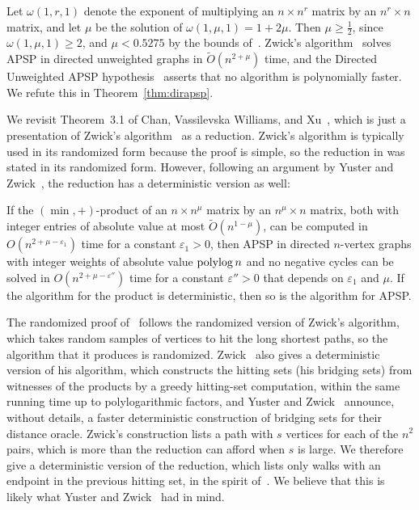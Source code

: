 Let $\omega(1,r,1)$ denote the exponent of multiplying an $n\times n^{r}$ matrix by an $n^{r}\times n$ matrix, and let $\mu$ be the solution of $\omega(1,\mu,1)=1+2\mu$. Then $\mu\ge\frac12$, since $\omega(1,\mu,1)\ge2$, and $\mu<0.5275$ by the bounds of~\cite{ADVXXZ25}. Zwick's algorithm~\cite{Zwi02} solves APSP in directed unweighted graphs in $\tilde O(n^{2+\mu})$ time, and the Directed Unweighted APSP hypothesis~\cite{CVX21,CVX23,Fis26} asserts that no algorithm is polynomially faster. We refute this in Theorem~\ref{thm:dirapsp}.

We revisit Theorem~3.1 of Chan, Vassilevska Williams, and Xu~\cite{CVX21}, which is just a presentation of Zwick's algorithm~\cite{Zwi02} as a reduction. Zwick's algorithm is typically used in its randomized form because the proof is simple, so the reduction in \cite{CVX21} was stated in its randomized form. However, following an argument by Yuster and Zwick~\cite[Section~8]{YZ05b}, the reduction has a deterministic version as well:

\begin{theorem}\label{thm:detred}
If the $(\min,+)$-product of an $n\times n^{\mu}$ matrix by an $n^{\mu}\times n$ matrix, both with integer entries of absolute value at most $\tilde{O}(n^{1-\mu})$, can be computed in $O(n^{2+\mu-\varepsilon_1})$ time for a constant $\varepsilon_1>0$, then APSP in directed $n$-vertex graphs with integer weights of absolute value $\operatorname{polylog} n$ and no negative cycles can be solved in $O(n^{2+\mu-\varepsilon''})$ time for a constant $\varepsilon''>0$ that depends on $\varepsilon_1$ and $\mu$. If the algorithm for the product is deterministic, then so is the algorithm for APSP.
\end{theorem}


The randomized proof of~\cite{CVX21} follows the randomized version of Zwick's algorithm, which takes random samples of vertices to hit the long shortest paths, so the algorithm that it produces is randomized. {Zwick~\cite[Sections~6 and~7]{Zwi02} also gives a deterministic version of his algorithm, which constructs the hitting sets (his bridging sets) from witnesses of the products by a greedy hitting-set computation, within the same running time up to polylogarithmic factors, and Yuster and Zwick~\cite[Section~8]{YZ05b} announce, without details, a faster deterministic construction of bridging sets for their distance oracle. Zwick's construction lists a path with $s$ vertices for each of the $n^2$ pairs, which is more than the reduction can afford when $s$ is large. We therefore give a deterministic version of the reduction, which lists only walks with an endpoint in the previous hitting set, in the spirit of~\cite{YZ05b}. We believe that this is likely what Yuster and Zwick~\cite{YZ05b} had in mind.} 


